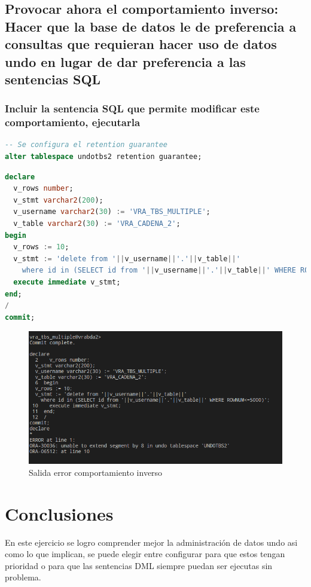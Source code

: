 \documentclass[journal]{IEEEtran}
\begin{document}
\subsection{Provocar ahora el comportamiento inverso: Hacer que la base de datos le de preferencia a consultas que requieran hacer uso de datos undo en lugar de dar preferencia a las sentencias SQL}
\subsubsection{Incluir la sentencia SQL que permite modificar este comportamiento, ejecutarla}
\begin{lstlisting}[language=sql, caption=Configuración priorizar datos undo,label={lst:codigo7}]
-- Se configura el retention guarantee
alter tablespace undotbs2 retention guarantee;
\end{lstlisting}
\begin{lstlisting}[language=sql, caption=script que se ejecuta constantemente para eliminar los datos y llenar undo,label={lst:codigo8}]
declare
  v_rows number;
  v_stmt varchar2(200);
  v_username varchar2(30) := 'VRA_TBS_MULTIPLE';
  v_table varchar2(30) := 'VRA_CADENA_2';
begin
  v_rows := 10;
  v_stmt := 'delete from '||v_username||'.'||v_table||'
    where id in (SELECT id from '||v_username||'.'||v_table||' WHERE ROWNUM<=5000)';
  execute immediate v_stmt;  
end;
/
commit;
\end{lstlisting}
\begin{figure}[H]
  \centering
  \includegraphics[scale=.23]{captura_8.png}
   \caption{Salida error comportamiento inverso}
   \label{fig:validador_8}
\end{figure}
\section{Conclusiones}
En este ejercicio se logro comprender mejor la administración de datos undo asi como lo que implican,
se puede elegir entre configurar para que estos tengan prioridad o para que las sentencias DML siempre puedan 
ser ejecutas sin problema.
\ifCLASSOPTIONcaptionsoff
  \newpage

\fi
\end{document}
